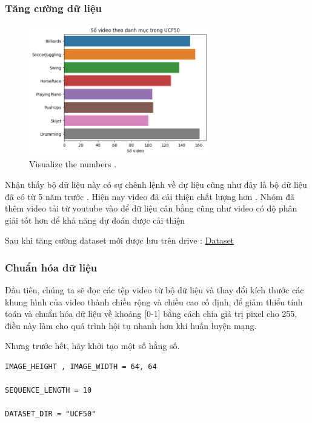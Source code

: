 \subsubsection{Tăng cường dữ liệu}
\begin{figure}[h!]
	\centering
	\includegraphics[width=0.7\textwidth]{Figures/numbersvideo.png}
	\caption[Visualize the numbers.]{Visualize the numbers .}
	\label{numbersvideo.png} 
    \end{figure}

Nhận thấy bộ dữ liệu này có sự chênh lệnh về dự liệu cũng như đây là bộ dữ liệu đã có từ 5 năm trước . Hiện nay video đã cải thiện chất lượng hơn . Nhóm đã thêm video tải từ youtube vào để dữ liệu cân bằng cũng như video có độ phân giải tốt hơn để khả năng dự đoán được cải thiện 

Sau khi tăng cường dataset mới được lưu trên drive : \href{https://drive.google.com/drive/folders/1GXIWkXE2PQTgVSl-xattG6JVyaDb1jgR?usp=sharing}{Dataset}
\subsubsection{Chuẩn hóa dữ liệu}
Đầu tiên, chúng ta sẽ đọc các tệp video từ bộ dữ liệu và thay đổi kích thước các khung hình của video thành chiều rộng và chiều cao cố định, để giảm thiểu tính toán và chuẩn hóa dữ liệu về khoảng [0-1] bằng cách chia giá trị pixel cho 255, điều này làm cho quá trình hội tụ nhanh hơn khi huấn luyện mạng.

Nhưng trước hết, hãy khởi tạo một số hằng số.


\begin{lstlisting}[style=codePython]
IMAGE_HEIGHT , IMAGE_WIDTH = 64, 64

SEQUENCE_LENGTH = 10

DATASET_DIR = "UCF50"
\end{lstlisting}


